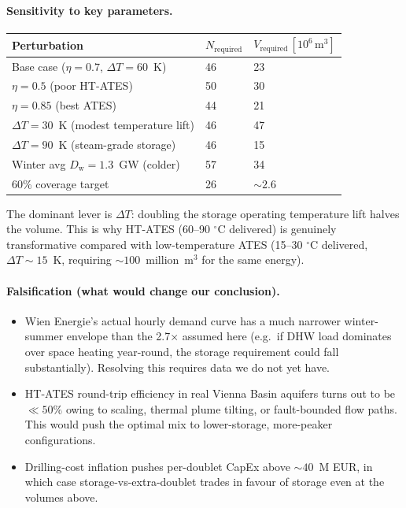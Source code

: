 \documentclass{article}
\begin{document}
\paragraph{Sensitivity to key parameters.}
\begin{center}
\begin{tabular}{lll}
\hline
\textbf{Perturbation} & $N_{\mathrm{required}}$ & $V_{\mathrm{required}}\,[10^6\,\mathrm{m^3}]$ \\
\hline
Base case ($\eta=0.7$, $\Delta T=60$~K)        & 46  & 23 \\
$\eta=0.5$ (poor HT-ATES)                       & 50  & 30 \\
$\eta=0.85$ (best ATES)                         & 44  & 21 \\
$\Delta T = 30$~K (modest temperature lift)     & 46  & 47 \\
$\Delta T = 90$~K (steam-grade storage)         & 46  & 15 \\
Winter avg $D_{\mathrm{w}}=1.3$~GW (colder)     & 57  & 34 \\
60\% coverage target                            & 26  & $\sim 2.6$ \\
\hline
\end{tabular}
\end{center}

The dominant lever is $\Delta T$: doubling the storage operating
temperature lift halves the volume. This is why HT-ATES (60--90
$^\circ$C delivered) is genuinely transformative compared with
low-temperature ATES (15--30 $^\circ$C delivered, $\Delta T \sim
15$~K, requiring $\sim 100$~million~m$^3$ for the same energy).

\paragraph{Falsification (what would change our conclusion).}
\begin{itemize}
\item Wien Energie's actual hourly demand curve has a much
narrower winter-summer envelope than the 2.7$\times$ assumed
here (e.g.\ if DHW load dominates over space heating year-round,
the storage requirement could fall substantially). Resolving this
requires data we do not yet have.
\item HT-ATES round-trip efficiency in real Vienna Basin aquifers
turns out to be $\ll 50\%$ owing to scaling, thermal plume
tilting, or fault-bounded flow paths. This would push the
optimal mix to lower-storage, more-peaker configurations.
\item Drilling-cost inflation pushes per-doublet CapEx above
$\sim 40$~M EUR, in which case storage-vs-extra-doublet trades
in favour of storage even at the volumes above.
\end{itemize}
\end{document}
